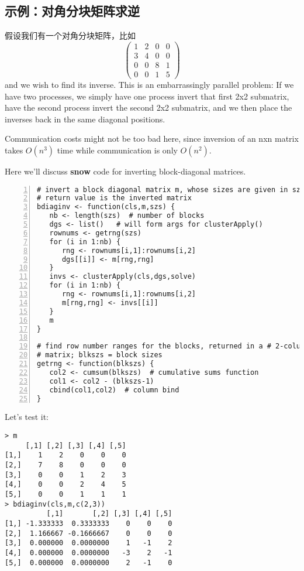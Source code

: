\subsection{示例：对角分块矩阵求逆}
\label{blkd}

假设我们有一个对角分块矩阵，比如
$$
\left (
   \begin{array}{cccc}
   1 & 2 & 0 & 0 \\
   3 & 4 & 0 & 0 \\
   0 & 0 & 8 & 1 \\
   0 & 0 & 1 & 5
   \end{array}
\right )
$$
and we wish to find its inverse.  This is an embarrassingly parallel
problem:  If we have two processes, we simply have one process invert that
first 2x2 submatrix, have the second process invert the second 2x2
submatrix, and we then place the inverses back in the same diagonal
positions.

Communication costs might not be too bad here, since inversion of an nxn
matrix takes $O(n^3)$ time while communication is only $O(n^2)$.

Here we'll discuss {\bf snow} code for inverting block-diagonal matrices.

\begin{lstlisting}[numbers=left]
# invert a block diagonal matrix m, whose sizes are given in szs;
# return value is the inverted matrix
bdiaginv <- function(cls,m,szs) {
   nb <- length(szs)  # number of blocks
   dgs <- list()   # will form args for clusterApply()
   rownums <- getrng(szs)
   for (i in 1:nb) {
      rng <- rownums[i,1]:rownums[i,2]
      dgs[[i]] <- m[rng,rng]
   }
   invs <- clusterApply(cls,dgs,solve)
   for (i in 1:nb) {
      rng <- rownums[i,1]:rownums[i,2]
      m[rng,rng] <- invs[[i]]
   }
   m
}

# find row number ranges for the blocks, returned in a # 2-column
# matrix; blkszs = block sizes
getrng <- function(blkszs) {
   col2 <- cumsum(blkszs)  # cumulative sums function
   col1 <- col2 - (blkszs-1)
   cbind(col1,col2)  # column bind
}
\end{lstlisting}

Let's test it:

\begin{lstlisting}
> m
     [,1] [,2] [,3] [,4] [,5]
[1,]    1    2    0    0    0
[2,]    7    8    0    0    0
[3,]    0    0    1    2    3
[4,]    0    0    2    4    5
[5,]    0    0    1    1    1
> bdiaginv(cls,m,c(2,3))
          [,1]       [,2] [,3] [,4] [,5]
[1,] -1.333333  0.3333333    0    0    0
[2,]  1.166667 -0.1666667    0    0    0
[3,]  0.000000  0.0000000    1   -1    2
[4,]  0.000000  0.0000000   -3    2   -1
[5,]  0.000000  0.0000000    2   -1    0
\end{lstlisting}

